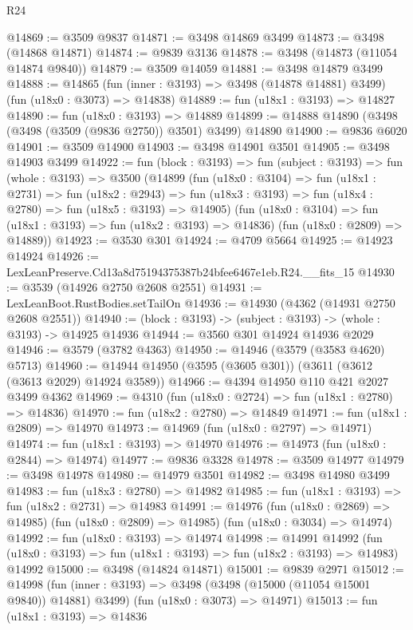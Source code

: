 \begin{lexlean}{R24}
\begin{coremodule}
@14869 := @3509 @9837
@14871 := @3498 @14869 @3499
@14873 := @3498 (@14868 @14871)
@14874 := @9839 @3136
@14878 := @3498 (@14873 (@11054 @14874 @9840))
@14879 := @3509 @14059
@14881 := @3498 @14879 @3499
@14888 := @14865
    (fun (inner : @3193) => @3498 (@14878 @14881) @3499)
    (fun (u18x0 : @3073) => @14838)
@14889 := fun (u18x1 : @3193) => @14827
@14890 := fun (u18x0 : @3193) => @14889
@14899 := @14888 @14890 (@3498 (@3498 (@3509 (@9836 @2750)) @3501) @3499) @14890
@14900 := @9836 @6020
@14901 := @3509 @14900
@14903 := @3498 @14901 @3501
@14905 := @3498 @14903 @3499
@14922 := fun (block : @3193) =>
  fun (subject : @3193) =>
  fun (whole : @3193) =>
  @3500
    (@14899
      (fun (u18x0 : @3104) =>
      fun (u18x1 : @2731) =>
      fun (u18x2 : @2943) =>
      fun (u18x3 : @3193) => fun (u18x4 : @2780) => fun (u18x5 : @3193) => @14905)
      (fun (u18x0 : @3104) => fun (u18x1 : @3193) => fun (u18x2 : @3193) => @14836)
      (fun (u18x0 : @2809) => @14889))
@14923 := @3530 @301
@14924 := @4709 @5664
@14925 := @14923 @14924
@14926 := LexLeanPreserve.Cd13a8d75194375387b24bfee6467e1eb.R24.__fits_15
@14930 := @3539 (@14926 @2750 @2608 @2551)
@14931 := LexLeanBoot.RustBodies.setTailOn
@14936 := @14930 (@4362 (@14931 @2750 @2608 @2551))
@14940 := (block : @3193) -> (subject : @3193) -> (whole : @3193) -> @14925 @14936
@14944 := @3560 @301 @14924 @14936 @2029
@14946 := @3579 (@3782 @4363)
@14950 := @14946 (@3579 (@3583 @4620) @5713)
@14960 := @14944 @14950 (@3595 (@3605 @301)) (@3611 (@3612 (@3613 @2029) @14924 @3589))
@14966 := @4394 @14950 @110 @421 @2027 @3499 @4362
@14969 := @4310 (fun (u18x0 : @2724) => fun (u18x1 : @2780) => @14836)
@14970 := fun (u18x2 : @2780) => @14849
@14971 := fun (u18x1 : @2809) => @14970
@14973 := @14969 (fun (u18x0 : @2797) => @14971)
@14974 := fun (u18x1 : @3193) => @14970
@14976 := @14973 (fun (u18x0 : @2844) => @14974)
@14977 := @9836 @3328
@14978 := @3509 @14977
@14979 := @3498 @14978
@14980 := @14979 @3501
@14982 := @3498 @14980 @3499
@14983 := fun (u18x3 : @2780) => @14982
@14985 := fun (u18x1 : @3193) => fun (u18x2 : @2731) => @14983
@14991 := @14976
    (fun (u18x0 : @2869) => @14985)
    (fun (u18x0 : @2809) => @14985)
    (fun (u18x0 : @3034) => @14974)
@14992 := fun (u18x0 : @3193) => @14974
@14998 := @14991
    @14992
    (fun (u18x0 : @3193) => fun (u18x1 : @3193) => fun (u18x2 : @3193) => @14983)
    @14992
@15000 := @3498 (@14824 @14871)
@15001 := @9839 @2971
@15012 := @14998
    (fun (inner : @3193) => @3498 (@3498 (@15000 (@11054 @15001 @9840)) @14881) @3499)
    (fun (u18x0 : @3073) => @14971)
@15013 := fun (u18x1 : @3193) => @14836

\end{coremodule}
\end{lexlean}
